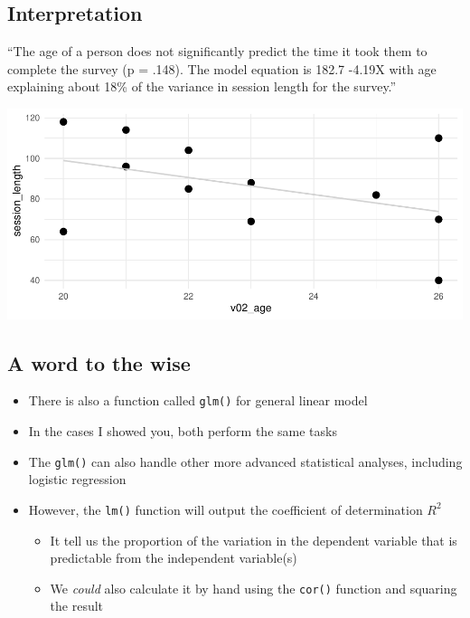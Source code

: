\documentclass[
]{book}
\providecommand{\tightlist}{%
  \setlength{\itemsep}{0pt}\setlength{\parskip}{0pt}}
\begin{document}
\subsection{Interpretation}\label{interpretation}

``The age of a person does not significantly predict the time it took them to complete the survey (p = .148). The model equation is 182.7 -4.19X with age explaining about 18\% of the variance in session length for the survey.''

\includegraphics{_main_files/figure-latex/unnamed-chunk-85-1.pdf}

\subsection{A word to the wise}\label{a-word-to-the-wise}

\begin{itemize}
\tightlist
\item
  There is also a function called \texttt{glm()} for general linear model
\item
  In the cases I showed you, both perform the same tasks
\item
  The \texttt{glm()} can also handle other more advanced statistical analyses, including logistic regression
\item
  However, the \texttt{lm()} function will output the coefficient of determination \(R^2\)

  \begin{itemize}
  \tightlist
  \item
    It tell us the proportion of the variation in the dependent variable that is predictable from the independent variable(s)
  \item
    We \emph{could} also calculate it by hand using the \texttt{cor()} function and squaring the result
  \end{itemize}
\end{itemize}
\end{document}
